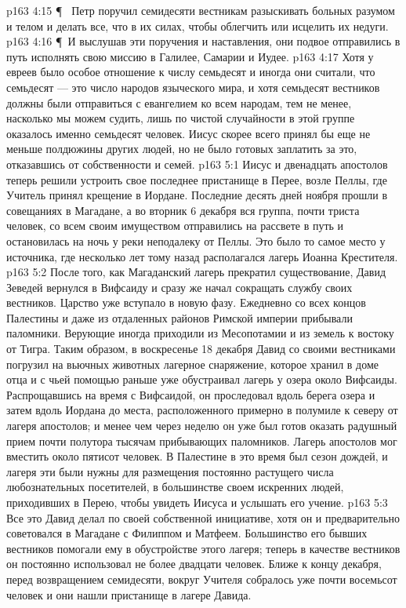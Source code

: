 \vs p163 4:15 \P\ \bibnobreakspace {} Петр поручил семидесяти вестникам разыскивать больных разумом и телом и делать все, что в их силах, чтобы облегчить или исцелить их недуги.
\vs p163 4:16 \P\ И выслушав эти поручения и наставления, они подвое отправились в путь исполнять свою миссию в Галилее, Самарии и Иудее.
\vs p163 4:17 Хотя у евреев было особое отношение к числу семьдесят и иногда они считали, что семьдесят --- это число народов языческого мира, и хотя семьдесят вестников должны были отправиться с евангелием ко всем народам, тем не менее, насколько мы можем судить, лишь по чистой случайности в этой группе оказалось именно семьдесят человек. Иисус скорее всего принял бы еще не меньше полдюжины других людей, но не было готовых заплатить за это, отказавшись от собственности и семей.
\vs p163 5:1 Иисус и двенадцать апостолов теперь решили устроить свое последнее пристанище в Перее, возле Пеллы, где Учитель принял крещение в Иордане. Последние десять дней ноября прошли в совещаниях в Магадане, а во вторник 6 декабря вся группа, почти триста человек, со всем своим имуществом отправились на рассвете в путь и остановилась на ночь у реки неподалеку от Пеллы. Это было то самое место у источника, где несколько лет тому назад располагался лагерь Иоанна Крестителя.
\vs p163 5:2 После того, как Магаданский лагерь прекратил существование, Давид Зеведей вернулся в Вифсаиду и сразу же начал сокращать службу своих вестников. Царство уже вступало в новую фазу. Ежедневно со всех концов Палестины и даже из отдаленных районов Римской империи прибывали паломники. Верующие иногда приходили из Месопотамии и из земель к востоку от Тигра. Таким образом, в воскресенье 18 декабря Давид со своими вестниками погрузил на вьючных животных лагерное снаряжение, которое хранил в доме отца и с чьей помощью раньше уже обустраивал лагерь у озера около Вифсаиды. Распрощавшись на время с Вифсаидой, он проследовал вдоль берега озера и затем вдоль Иордана до места, расположенного примерно в полумиле к северу от лагеря апостолов; и менее чем через неделю он уже был готов оказать радушный прием почти полутора тысячам прибывающих паломников. Лагерь апостолов мог вместить около пятисот человек. В Палестине в это время был сезон дождей, и лагеря эти были нужны для размещения постоянно растущего числа любознательных посетителей, в большинстве своем искренних людей, приходивших в Перею, чтобы увидеть Иисуса и услышать его учение.
\vs p163 5:3 Все это Давид делал по своей собственной инициативе, хотя он и предварительно советовался в Магадане с Филиппом и Матфеем. Большинство его бывших вестников помогали ему в обустройстве этого лагеря; теперь в качестве вестников он постоянно использовал не более двадцати человек. Ближе к концу декабря, перед возвращением семидесяти, вокруг Учителя собралось уже почти восемьсот человек и они нашли пристанище в лагере Давида.
